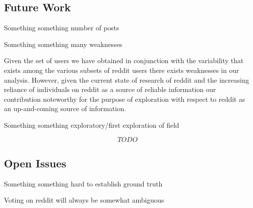 \lipsum[1]

\subsection{Future Work} %
\label{sub:future_work}

Something something number of posts

Something something many weaknesses

Given the set of users we have obtained in conjunction with the variability that exists among the various subsets of reddit users there exists weaknesses in our analysis. However, given the current state of research of reddit and the increasing reliance of individuals on reddit as a source of reliable information our contribution noteworthy for the purpose of exploration with respect to reddit as an up-and-coming source of information.

Something something exploratory/first exploration of field

\[TODO\]



\subsection{Open Issues} %
\label{sub:open_issues}

Something something hard to establish ground truth

Voting on reddit will always be somewhat ambiguous

